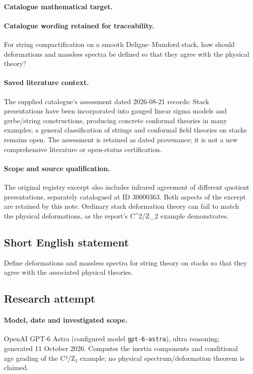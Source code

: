 \documentclass[11pt]{article}
\begin{document}
\paragraph{Catalogue mathematical target.}
\paragraph{Catalogue wording retained for traceability.}
For string compactification on a smooth Deligne–Mumford stack, how should deformations and massless spectra be defined so that they agree with the physical theory?

\paragraph{Saved literature context.} The supplied catalogue's assessment dated 2026-08-21 records: Stack presentations have been incorporated into gauged linear sigma models and gerbe/string constructions, producing concrete conformal theories in many examples; a general classification of strings and conformal field theories on stacks remains open. The assessment is retained as dated provenance; it is not a new comprehensive literature or open-status certification.
\paragraph{Scope and source qualification.}The original registry excerpt also includes infrared agreement of different quotient presentations, separately catalogued at ID 30000363. Both aspects of the excerpt are retained by this note. Ordinary stack deformation theory can fail to match the physical deformations, as the report's C^2/Z_2 example demonstrates.
\subsection{Short English statement}
Define deformations and massless spectra for string theory on stacks so that they agree with the associated physical theories.
\subsection{Research attempt}
\paragraph{Model, date and investigated scope.}
OpenAI GPT-6 Astra (configured model \texttt{gpt-6-astra}), ultra reasoning; generated 11 October 2026. Computes the inertia components and conditional age grading of the C²/Z₂ example; no physical spectrum/deformation theorem is claimed.
\end{document}
